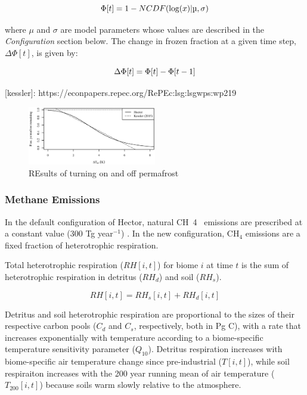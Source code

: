 \documentclass[essd, manuscript]{copernicus}
\begin{document}
\begin{equation*}
\Phi[t] = 1 - NCDF(\log(x) | \mu, \sigma)\\
\end{equation*}

where $\mu$ and $\sigma$ are model parameters whose values are described in the \textit{Configuration} section below.
The change in frozen fraction at a given time step, $\Delta \Phi[t]$, is given by:

\begin{equation*}
\Delta \Phi[t] = \Phi[t] - \Phi[t-1]\\
\end{equation*}

[kessler]: https://econpapers.repec.org/RePEc:lsg:lsgwps:wp219

\begin{figure}
    \centering
    \includegraphics[width=0.5\textwidth]{figures/hector_vs_kessler.eps}
    \caption{REsults of turning on and off permafrost}
    \label{fig:4panel}
\end{figure}


\subsubsection{Methane Emissions}
In the default configuration of Hector, natural CH~4~ emissions are prescribed at a constant value (300 Tg year$^{-1}$) \citep{hartin_2015_simple}.
In the new configuration, CH$_4$ emissions are a fixed fraction of heterotrophic respiration.

Total heterotrophic respiration ($RH[i,t]$) for biome $i$ at time $t$ is the sum of heterotrophic respiration in detritus ($RH_d$) and soil ($RH_s$).

\begin{equation*} 
RH[i,t] = RH_s[i,t] + RH_d[i,t]
\end{equation*}

Detritus and soil heterotrophic respiration are proportional to the sizes of their respective carbon pools ($C_d$ and $C_s$, respectively, both in Pg C),
with a rate that increases exponentially with temperature according to a biome-specific temperature sensitivity parameter ($Q_{10}$).
Detritus respiration increases with biome-specific air temperature change since pre-industrial ($T[i,t]$),
while soil respiraiton increases with the 200 year running mean of air temperature ($T_{200}[i,t]$) because soils warm slowly relative to the atmosphere.
\end{document}
